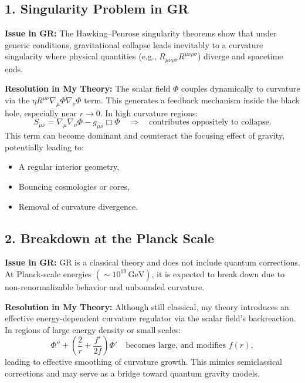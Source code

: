 \documentclass[12pt]{article}
\begin{document}
\subsection{1. Singularity Problem in GR}

\textbf{Issue in GR:}  
The Hawking–Penrose singularity theorems show that under generic conditions, gravitational collapse leads inevitably to a curvature singularity where physical quantities (e.g., \( R_{\mu\nu\rho\sigma} R^{\mu\nu\rho\sigma} \)) diverge and spacetime ends.

\textbf{Resolution in My Theory:}  
The scalar field \( \Phi \) couples dynamically to curvature via the \( \eta R^{\mu\nu} \nabla_\mu \Phi \nabla_\nu \Phi \) term. This generates a feedback mechanism inside the black hole, especially near \( r \to 0 \). In high curvature regions:
\begin{equation}
S_{\mu\nu} = \nabla_\mu \nabla_\nu \Phi - g_{\mu\nu} \Box \Phi \quad \Rightarrow \quad \text{contributes oppositely to collapse}.
\end{equation}
This term can become dominant and counteract the focusing effect of gravity, potentially leading to:
\begin{itemize}
    \item A regular interior geometry,
    \item Bouncing cosmologies or cores,
    \item Removal of curvature divergence.
\end{itemize}

\subsection{2. Breakdown at the Planck Scale}

\textbf{Issue in GR:}  
GR is a classical theory and does not include quantum corrections. At Planck-scale energies \( (\sim 10^{19} \, \text{GeV}) \), it is expected to break down due to non-renormalizable behavior and unbounded curvature.

\textbf{Resolution in My Theory:}  
Although still classical, my theory introduces an effective energy-dependent curvature regulator via the scalar field’s backreaction. In regions of large energy density or small scales:
\[
\Phi'' + \left( \frac{2}{r} + \frac{f'}{2f} \right) \Phi' \quad \text{becomes large, and modifies } f(r),
\]
leading to effective smoothing of curvature growth. This mimics semiclassical corrections and may serve as a bridge toward quantum gravity models.
\end{document}
